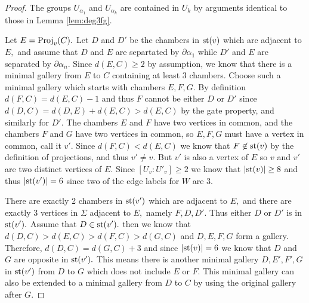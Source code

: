 \documentclass[class=book, crop=false]{standalone}
\begin{document}
\begin{proof}
	The groups $U_{\alpha_1}$ and $U_{\alpha_k}$ are contained in $U_k$ by arguments identical to those in Lemma \ref{lem:deg3fg}.

	Let $E=\mathrm{Proj}_v(C).$ Let $D$ and $D'$ be the chambers in $\mathrm{st}(v)$ which are adjacent to $E,$ and assume that $D$ and $E$ are separtated by $\partial\alpha_1$ while $D'$ and $E$ are separated by $\partial\alpha_n.$ Since $d(E,C)\ge 2$ by assumption, we know that there is a minimal gallery from $E$ to $C$ containing at least 3 chambers. Choose such a minimal gallery which starts with chambers $E,F,G.$ By definition $d(F,C)=d(E,C)-1$ and thus $F$ cannot be either $D$ or $D'$ since $d(D,C)=d(D,E)+d(E,C)>d(E,C)$ by the gate property, and similarly for $D'.$ The chambers $E$ and $F$ have two vertices in common, and the chambers $F$ and $G$ have two vertices in common, so $E,F,G$ must have a vertex in common, call it $v'.$ Since $d(F,C)<d(E,C)$ we know that $F\not\in \mathrm{st}(v)$ by the definition of projections, and thus $v'\neq v.$ But $v'$ is also a vertex of $E$ so $v$ and $v'$ are two distinct vertices of $E.$ Since $[U_v:U'_v]\ge 2$ we know that $|\mathrm{st}(v)|\ge 8$ and thus $|\mathrm{st}(v')|=6$ since two of the edge labels for $W$ are 3.

	There are exactly 2 chambers in $\mathrm{st}(v')$ which are adjacent to $E,$ and there are exactly 3 vertices in $\Sigma$ adjacent to $E,$ namely $F,D,D'.$ Thus either $D$ or $D'$ is in $\mathrm{st}(v').$ Assume that $D\in \mathrm{st}(v').$ then we know that $d(D,C)>d(E,C)>d(F,C)>d(G,C)$ and $D,E,F,G$ form a gallery. Therefore, $d(D,C)=d(G,C)+3$ and since $|\mathrm{st}(v)|=6$ we know that $D$ and $G$ are opposite in $\mathrm{st}(v').$ This means there is another minimal gallery $D,E',F',G$ in $\mathrm{st}(v')$ from $D$ to $G$ which does not include $E$ or $F.$ This minimal gallery can also be extended to a minimal gallery from $D$ to $C$ by using the original gallery after $G.$


\end{proof}
\end{document}
